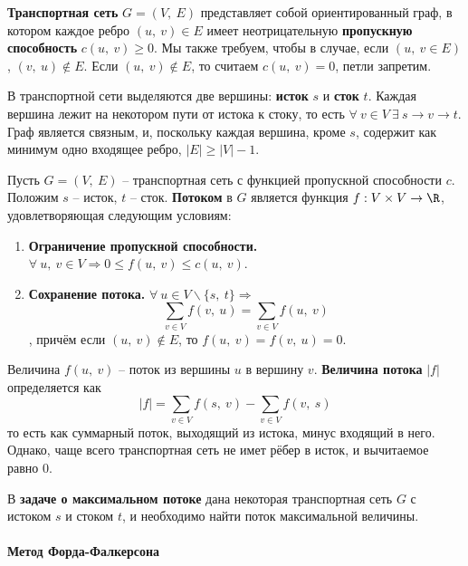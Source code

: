 \documentclass[a4paper,12pt]{article}
\begin{document}
\begin{definition}
    \textbf{Транспортная сеть} $G = (V,\ E)$ представляет собой ориентированный граф, в котором каждое ребро $(u,\ v) \in E$ имеет неотрицательную \textbf{пропускную способность} $c(u,\ v) \geqslant 0$. Мы также требуем, чтобы в случае, если $(u,\ v \in E)$, $(v,\ u) \notin E$. Если $(u,\ v) \notin E$, то считаем $c(u,\ v) = 0$, петли запретим.
    
    В транспортной сети выделяются две вершины: \textbf{исток} $s$ и \textbf{сток} $t$. Каждая вершина лежит на некотором пути от истока к стоку, то есть $\forall\ v \in V\ \exists\ s \to v \to t$. Граф является связным, и, поскольку каждая вершина, кроме $s$, содержит как минимум одно входящее ребро, $|E|\geqslant|V| - 1$.
\end{definition}

\begin{definition}
    Пусть $G = (V,\ E)$ -- транспортная сеть с функцией пропускной способности $c$. Положим $s$ -- исток, $t$ -- сток. \textbf{Потоком} в $G$ является функция $f : V \times V \to \R$, удовлетворяющая следующим условиям:
    \begin{enumerate}
        \item \textbf{Ограничение пропускной способности.} $\forall\ u,\ v \in V \Rightarrow 0 \leqslant f(u,\ v) \leqslant c(u,\ v)$.
        \item \textbf{Сохранение потока.} $\forall\ u \in V\backslash \{s,\ t\} \Rightarrow$ \[\sum\limits_{v \in V}f(v,\ u) = \sum\limits_{v \in V}f(u,\ v)\], причём если $(u,\ v) \notin E$, то $f(u,\ v) = f(v,\ u) = 0$.
    \end{enumerate}
    
    Величина $f(u,\ v)$ -- поток из вершины $u$ в вершину $v$. \textbf{Величина потока} $|f|$ определяется как \[|f| = \sum\limits_{v \in V}f(s,\ v) - \sum\limits_{v \in V}f(v,\ s)\] то есть как суммарный поток, выходящий из истока, минус входящий в него. Однако, чаще всего транспортная сеть не имет рёбер в исток, и вычитаемое равно 0.
\end{definition}

В \textbf{задаче о максимальном потоке} дана некоторая транспортная сеть $G$ с истоком $s$ и стоком $t$, и необходимо найти поток максимальной величины.

\paragraph{Метод Форда-Фалкерсона}
\end{document}
